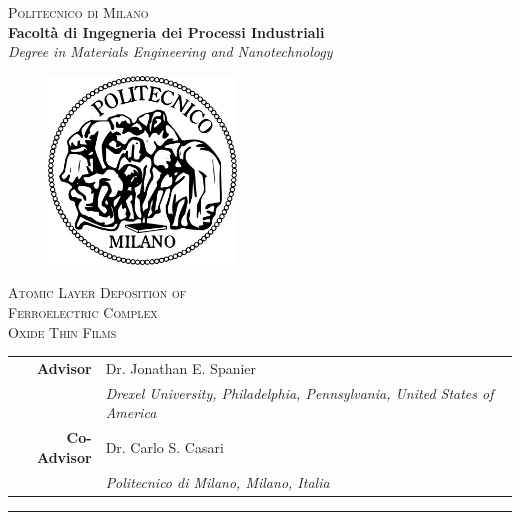 \thispagestyle{empty}
\begin{titlepage}
\vspace*{-3cm}
\begin{center}
  {\LARGE
  \textsc{Politecnico di Milano}\\
  \textbf{\Large
  Facolt\`a di Ingegneria dei Processi Industriali}\\
  \emph{\large Degree in Materials Engineering and Nanotechnology}}\\
  \vspace*{0.5cm}
  \begin{figure}[htbp]
    \begin{center}
      \includegraphics[width=5cm]{./pictures/logopm.png}
    \end{center}
  \end{figure}
  \vspace{-0.3cm}
   {\huge\textsc{
  Atomic Layer Deposition of \\
  Ferroelectric Complex\\Oxide Thin Films\\
  }}

  
  
\end{center}
\vspace{0.3cm} 
\large
\begin{centering}

\begin{tabular*}{0.75\textwidth}{>{\bfseries}r l}
  Advisor & Dr. Jonathan E. Spanier \\
  & \emph{\tiny Drexel University, Philadelphia, Pennsylvania, United States of America}\\
  Co-Advisor  & Dr. Carlo S. Casari \\
  & \emph{\tiny Politecnico di Milano, Milano, Italia}
  \vspace{0.3cm}
\end{tabular*}

\end{centering}
\rule{\linewidth}{0.5mm}
\begin{centering}


\end{centering}
\end{titlepage}
